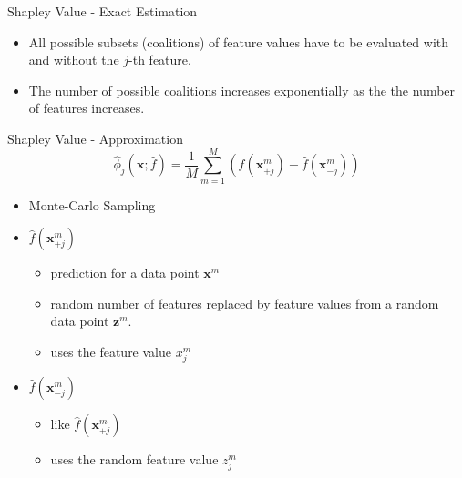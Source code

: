 \begin{frame}{Shapley Value - Exact Estimation}
	\begin{itemize}\setlength\itemsep{4em}
		\item All possible subsets (coalitions) of feature values have to be evaluated with and without the $j$-th feature.
		\item The number of possible coalitions increases exponentially as the the number of features increases.
	\end{itemize}
\end{frame}
\begin{frame}{Shapley Value - Approximation\footnotemark}
\begin{equation}
	\hat{\phi}_{j}\left(\bm{x};\hat{f}\right)=\frac{1}{M}\sum_{m=1}^M\left(\hat{f}\left(\bm{x}^{m}_{+j}\right)-\hat{f}\left(\bm{x}^{m}_{-j}\right)\right)
\end{equation}
\begin{itemize}
	\item Monte-Carlo Sampling
	\item $\hat{f}\left(\bm{x}^{m}_{+j}\right)$
	\begin{itemize}
		\item prediction for a data point $\bm{x}^m$
		\item random number of features replaced by feature values from a random data point $\bm{z}^m$.
		\item uses the feature value $x^m_j$
	\end{itemize}
	\item $\hat{f}\left(\bm{x}^{m}_{-j}\right)$
	\begin{itemize}
		\item like $\hat{f}\left(\bm{x}^{m}_{+j}\right)$
		\item uses the random feature value $z^m_j$
	\end{itemize}
\end{itemize}
\end{frame}